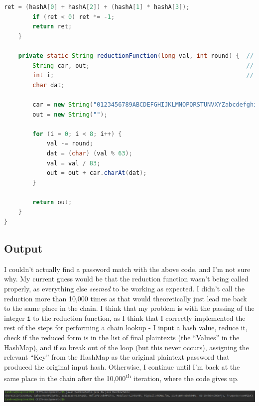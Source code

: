 \documentclass[a4paper]{article}
\begin{document}
\begin{lstlisting}[language=java]
        ret = (hashA[0] + hashA[2]) + (hashA[1] * hashA[3]);
        if (ret < 0) ret *= -1;
        return ret;
    } 
    
    private static String reductionFunction(long val, int round) {  // Note that for the first function call "round" has to be 0, 
        String car, out;                                            // and has to be incremented by one with every subsequent call. 
        int i;                                                      // I.e. "round" created variations of the reduction function.
        char dat;                                                  
        
        car = new String("0123456789ABCDEFGHIJKLMNOPQRSTUNVXYZabcdefghijklmnopqrstuvwxyz!#");
        out = new String("");
      
        for (i = 0; i < 8; i++) {
            val -= round;
            dat = (char) (val % 63);
            val = val / 83;
            out = out + car.charAt(dat);
        }
        
        return out;
    }
}

\end{lstlisting}
\subsection{Output}
I couldn't actually find a password match with the above code, and I'm not sure why. My current guess would be that the reduction function wasn't being called properly, as everything else \textit{seemed} to be working as expected. I didn't call the reduction more than 10,000 times as that would theoretically just lead me back to the same place in the chain. I think that my problem is with the passing of the integer \verb|i| to the reduction function, as I think that I correctly implemented the rest of the steps for performing a chain lookup - I input a hash value, reduce it, check if the reduced form is in the list of final plaintexts (the ``Values'' in the HashMap), and if so break out of the loop (but this never occurs), assigning the relevant ``Key'' from the HashMap as the original plaintext password that produced the original input hash. Otherwise, I continue until I'm back at the same place in the chain after the 10,000\textsuperscript{th} iteration, where the code gives up. 

\bigskip

\includegraphics[width = 16cm]{image.png}
\end{document}
